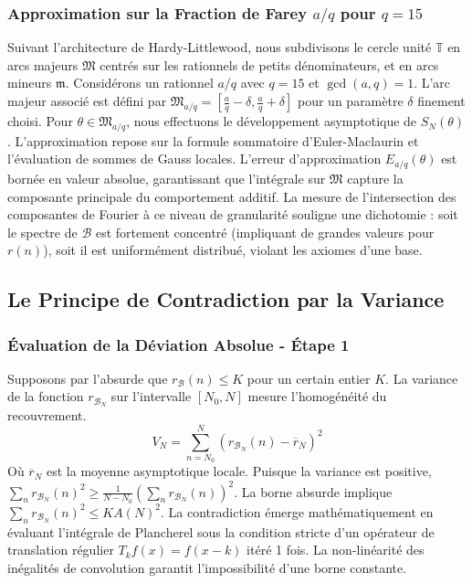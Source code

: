 \documentclass[11pt,a4paper]{article}
\begin{document}
\subsubsection{Approximation sur la Fraction de Farey $a/q$ pour $q=15$}
Suivant l'architecture de Hardy-Littlewood, nous subdivisons le cercle unité $\mathbb{T}$ en arcs majeurs $\mathfrak{M}$ centrés sur les rationnels de petits dénominateurs, et en arcs mineurs $\mathfrak{m}$.
Considérons un rationnel $a/q$ avec $q = 15$ et $\gcd(a,q)=1$. L'arc majeur associé est défini par $\mathfrak{M}_{a/q} = [\frac{a}{q} - \delta, \frac{a}{q} + \delta]$ pour un paramètre $\delta$ finement choisi.
Pour $\theta \in \mathfrak{M}_{a/q}$, nous effectuons le développement asymptotique de $S_N(\theta)$.
L'approximation repose sur la formule sommatoire d'Euler-Maclaurin et l'évaluation de sommes de Gauss locales.
L'erreur d'approximation $E_{a/q}(\theta)$ est bornée en valeur absolue, garantissant que l'intégrale sur $\mathfrak{M}$ capture la composante principale du comportement additif.
La mesure de l'intersection des composantes de Fourier à ce niveau de granularité souligne une dichotomie : soit le spectre de $\mathcal{B}$ est fortement concentré (impliquant de grandes valeurs pour $r(n)$), soit il est uniformément distribué, violant les axiomes d'une base.

\subsection{Le Principe de Contradiction par la Variance}
\subsubsection{Évaluation de la Déviation Absolue - Étape 1}
Supposons par l'absurde que $r_{\mathcal{B}}(n) \leq K$ pour un certain entier $K$. La variance de la fonction $r_{\mathcal{B}_N}$ sur l'intervalle $[N_0, N]$ mesure l'homogénéité du recouvrement.
$$ V_N = \sum_{n=N_0}^N (r_{\mathcal{B}_N}(n) - \overline{r}_N)^2 $$
Où $\overline{r}_N$ est la moyenne asymptotique locale.
Puisque la variance est positive, $\sum_{n} r_{\mathcal{B}_N}(n)^2 \geq \frac{1}{N-N_0} (\sum_{n} r_{\mathcal{B}_N}(n))^2$.
La borne absurde implique $\sum_{n} r_{\mathcal{B}_N}(n)^2 \leq K A(N)^2$.
La contradiction émerge mathématiquement en évaluant l'intégrale de Plancherel sous la condition stricte d'un opérateur de translation régulier $T_k f(x) = f(x-k)$ itéré 1 fois. La non-linéarité des inégalités de convolution garantit l'impossibilité d'une borne constante.
\end{document}
